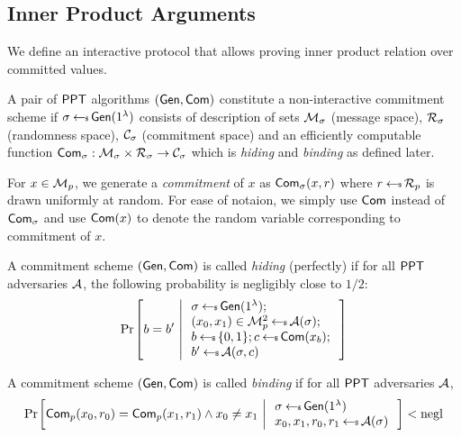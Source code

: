 \subsection{Inner Product Arguments}
We define an interactive protocol that allows proving inner product relation over committed values. 
\begin{definition}\label{defn:commscheme}
 A pair of $\mathsf{PPT}$ algorithms $(\mathsf{Gen},\mathsf{Com})$ constitute a non-interactive commitment scheme if $\sigma\hskip2.3pt{\gets\!\!\mbox{\tiny${\$}$\normalsize}}\, \mathsf{Gen}(1^{\lambda})$ consists of description of sets $\mathcal{M}_\sigma$ (message space), $\mathcal{R}_\sigma$ (randomness space), $\mathcal{C}_\sigma$ (commitment space) and an efficiently computable function $\mathsf{Com}_\sigma: \mathcal{M}_\sigma\times \mathcal{R}_\sigma\rightarrow \mathcal{C}_\sigma$ which is {\em hiding} and {\em binding} as defined later.
\end{definition}

For $x\in \mathcal{M}_p$, we generate a {\em commitment} of $x$ as $\mathsf{Com}_\sigma(x,r)$ where $r\hskip2.3pt{\gets\!\!\mbox{\tiny${\$}$\normalsize}}\, \mathcal{R}_p$ is drawn uniformly at random. For ease of notaion, we simply use $\mathsf{Com}$ instead of $\mathsf{Com}_\sigma$ and use $\mathsf{Com}(x)$ to denote the random variable corresponding to commitment of $x$. 

\begin{definition}\label{defn:hidingcomm}
A commitment scheme $(\mathsf{Gen},\mathsf{Com})$ is called {\em hiding} (perfectly) if for all $\mathsf{PPT}$ adversaries $\mathcal{A}$, the following probability is negligibly close to $1/2$:
\begin{align*}
\condprob{b=b'}{
\begin{array}{l}
\sigma\sample \gen(\secparam); \\
(x_0,x_1)\in \calM^2_p\sample \adv(\sigma); \\
b\sample \bitset; c\sample \com(x_b);\\
b'\sample \adv(\sigma,c)
\end{array}
}
\end{align*}
\end{definition}

\begin{definition}\label{defn:bindingcomm}
A commitment scheme $(\mathsf{Gen},\mathsf{Com})$ is called {\em binding} if for all $\mathsf{PPT}$ adversaries $\mathcal{A}$, 
\begin{align*}
\condprob{\com_p(x_0,r_0)=\com_p(x_1,r_1)\wedge x_0\neq x_1}{
\begin{array}{l}
\sigma\sample \gen(\secparam) \\
x_0,x_1,r_0,r_1 \sample \adv(\sigma)
\end{array}
} < \negl
\end{align*}

\end{definition}


